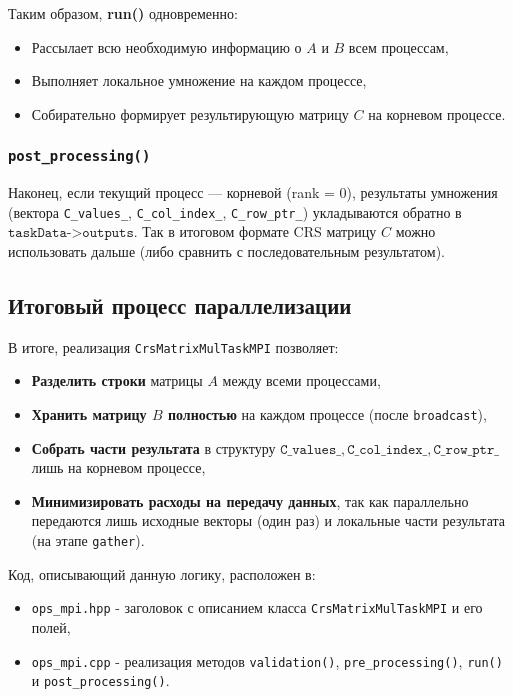 \documentclass[12pt]{article}
\begin{document}
Таким образом, \textbf{run()} одновременно:
\begin{itemize}
    \item Рассылает всю необходимую информацию о \(A\) и \(B\) всем процессам,
    \item Выполняет локальное умножение на каждом процессе,
    \item Собирательно формирует результирующую матрицу \(C\) на корневом процессе.
\end{itemize}

\subsubsection{\texttt{post\_processing()}}
Наконец, если текущий процесс --- корневой (rank = 0), результаты умножения (вектора \texttt{C\_values\_}, \texttt{C\_col\_index\_}, \texttt{C\_row\_ptr\_}) укладываются обратно в \(\texttt{taskData->outputs}\). Так в итоговом формате CRS матрицу \(C\) можно использовать дальше (либо сравнить с последовательным результатом).

\subsection{Итоговый процесс параллелизации}

В итоге, реализация \texttt{CrsMatrixMulTaskMPI} позволяет:
\begin{itemize}
    \item \textbf{Разделить строки} матрицы \(A\) между всеми процессами,
    \item \textbf{Хранить матрицу \(B\) полностью} на каждом процессе (после \texttt{broadcast}),
    \item \textbf{Собрать части результата} в структуру \(\texttt{C\_values\_}, \texttt{C\_col\_index\_}, \texttt{C\_row\_ptr\_}\) лишь на корневом процессе,
    \item \textbf{Минимизировать расходы на передачу данных}, так как параллельно передаются лишь исходные векторы (один раз) и локальные части результата (на этапе \texttt{gather}).
\end{itemize}

Код, описывающий данную логику, расположен в:
\begin{itemize}
    \item \texttt{ops\_mpi.hpp} - заголовок с описанием класса \texttt{CrsMatrixMulTaskMPI} и его полей,
    \item \texttt{ops\_mpi.cpp} - реализация методов \texttt{validation()}, \texttt{pre\_processing()}, \texttt{run()} и \texttt{post\_processing()}.
\end{itemize}
\end{document}
